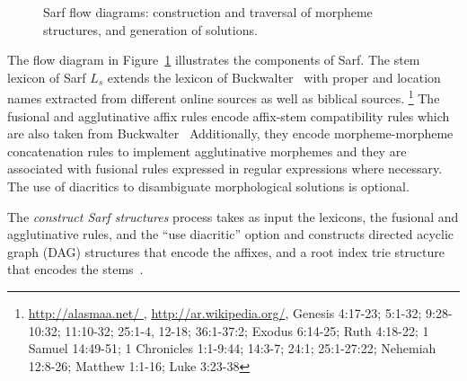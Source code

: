 \begin{figure}
\centering
\resizebox{.8\textwidth}{!} {
  
}
 \caption{Sarf flow diagrams: construction and traversal of morpheme structures, and generation of solutions.}
 \label{fig:flowdiagram}
\end{figure}
The flow diagram in Figure~\ref{fig:flowdiagram} illustrates the components of Sarf. 
The stem lexicon of Sarf $L_s$ extends the lexicon of 
Buckwalter~\citep{Buckwalter:02} with 
proper and location names extracted from different online 
sources as well as biblical sources.
\footnote{\href{http://alasmaa.net/}{http://alasmaa.net/ }, 
\href{http://ar.wikipedia.org/}{http://ar.wikipedia.org/},
Genesis 4:17-23; 5:1-32; 9:28-10:32; 11:10-32; 25:1-4, 12-18; 36:1-37:2; Exodus 6:14-25; Ruth 4:18-22; 1 Samuel 14:49-51; 1 Chronicles 1:1-9:44; 14:3-7; 24:1; 25:1-27:22; Nehemiah 12:8-26; Matthew 1:1-16; Luke 3:23-38}
The fusional and agglutinative affix rules 
encode affix-stem compatibility rules which are also taken from Buckwalter~\citep{Buckwalter:02} 
Additionally, they encode morpheme-morpheme concatenation rules to implement 
agglutinative morphemes and they are associated with fusional rules expressed in 
regular expressions where necessary.
The use of diacritics to disambiguate morphological solutions is optional. 

The {\em construct Sarf structures} process takes as input 
the lexicons, the fusional and agglutinative rules, and 
the ``use diacritic''  option 
and constructs directed acyclic graph (DAG) structures that encode the 
affixes, and a root index trie structure that encodes the stems~\citep*{Aoe:89}. 

